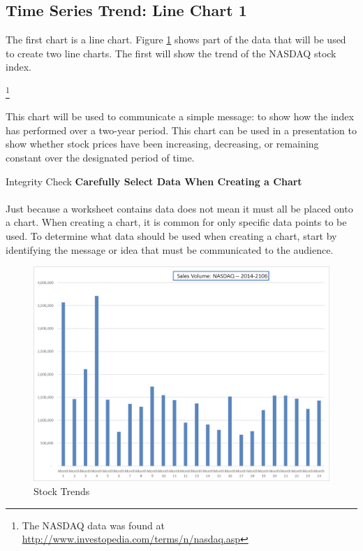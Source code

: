 \subsection{Time Series Trend: Line Chart 1}

The first chart is a line chart. Figure \ref{04:fig01} shows part of the data that will be used to create two line charts. The first will show the trend of the NASDAQ stock index.

\footnote{The NASDAQ data was found at \url{http://www.investopedia.com/terms/n/nasdaq.asp}}

This chart will be used to communicate a simple message: to show how the index has performed over a two-year period. This chart can be used in a presentation to show whether stock prices have been increasing, decreasing, or remaining constant over the designated period of time.

\begin{center}
	\begin{infobox}{Integrity Check}
		\textbf{Carefully Select Data When Creating a Chart}
		\\
		\\
		Just because a worksheet contains data does not mean it must all be placed onto a chart. When creating a chart, it is common for only specific data points to be used. To determine what data should be used when creating a chart, start by identifying the message or idea that must be communicated to the audience.
	\end{infobox}
\end{center}

\begin{figure}[H]
	\centering
	\includegraphics[width=\maxwidth{.95\linewidth}]{gfx/ch04_fig01}
	\caption{Stock Trends}
	\label{04:fig01}
\end{figure}


